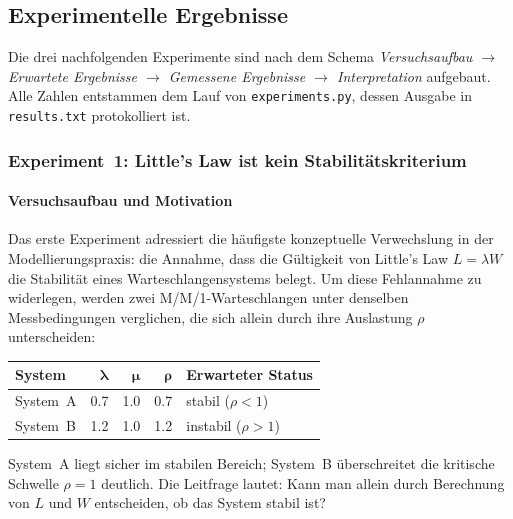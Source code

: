 ﻿\documentclass[a4paper,12pt]{scrreprt}
\theoremstyle{definition}
\begin{document}
\subsection{Experimentelle Ergebnisse}
\label{subsec:experimente}

Die drei nachfolgenden Experimente sind nach dem Schema
\emph{Versuchsaufbau $\to$ Erwartete Ergebnisse $\to$ Gemessene
	Ergebnisse $\to$ Interpretation} aufgebaut.  Alle Zahlen entstammen
dem Lauf von \texttt{experiments.py}, dessen Ausgabe in
\texttt{results.txt} protokolliert ist.

\subsubsection{Experiment~1: Little's Law ist kein Stabilitätskriterium}
\label{subsubsec:exp1}

\paragraph{Versuchsaufbau und Motivation}

Das erste Experiment adressiert die häufigste konzeptuelle
Verwechslung in der Modellierungspraxis: die Annahme, dass die
Gültigkeit von Little's Law $L = \lambda W$ die Stabilität eines
Warteschlangensystems belegt.  Um diese Fehlannahme zu widerlegen,
werden zwei M/M/1-Warteschlangen unter denselben Messbedingungen
verglichen, die sich allein durch ihre Auslastung $\rho$ unterscheiden:

\begin{center}
	\begin{tabular}{@{}lrrrl@{}}
		\toprule
		\textbf{System} & $\boldsymbol{\lambda}$ & $\boldsymbol{\mu}$ &
		$\boldsymbol{\rho}$ & \textbf{Erwarteter Status} \\
		\midrule
		System~A & 0.7 & 1.0 & 0.7 & stabil ($\rho < 1$) \\
		System~B & 1.2 & 1.0 & 1.2 & instabil ($\rho > 1$) \\
		\bottomrule
	\end{tabular}
\end{center}

System~A liegt sicher im stabilen Bereich; System~B überschreitet die
kritische Schwelle $\rho = 1$ deutlich.  Die Leitfrage lautet: Kann
man allein durch Berechnung von $L$ und $W$ entscheiden, ob das System
stabil ist?
\end{document}
